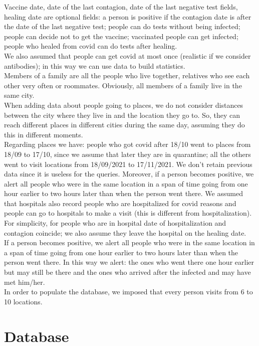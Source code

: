 \documentclass[12pt, a4paper]{article}
\begin{document}
Vaccine date, date of the last contagion, date of the last negative test fields, 
healing date are optional fields: a person is positive if the contagion date is 
after the date of the last negative test; people can do tests without being 
infected; people can decide not to get the vaccine; vaccinated people can get 
infected; people who healed from covid can do tests after healing. \\
We also assumed that people can get covid at most once (realistic if we consider 
antibodies); in this way we can use data to build statistics. \\
Members of a family are all the people who live together, relatives who see 
each other very often or roommates. Obviously, all members of a family live in 
the same city. \\
When adding data about people going to places, we do not consider distances 
between the city where they live in and the location they go to. So, they can 
reach different places in different cities during the same day, assuming they 
do this in different moments. \\
Regarding places we have: people who got covid after 18/10 went to places from 
18/09 to 17/10, since we assume that later they are in quarantine; all the 
others went to visit locations from 18/09/2021 to 17/11/2021. We don’t retain 
previous data since it is useless for the queries. Moreover, if a person becomes 
positive, we alert all people who were in the same location in a span of time 
going from one hour earlier to two hours later than when the person went 
there. We assumed that hospitals also record people who are hospitalized for covid reasons and people can go to hospitals to make a visit (this is different 
from hospitalization). For simplicity, for people who are in hospital date of hospitalization and 
contagion coincide; we also assume they leave the hospital on the healing 
date. \\ If a person becomes positive, we alert all people who were in the same location in a span of time going from one hour earlier to two hours later than when the person went there.
In this way we alert: the ones who went 
there one hour earlier but may still be there and the ones who arrived after the 
infected and may have met him/her. \\
In order to populate the database, we imposed that every person visits from 6 
to 10 locations. 

\clearpage

\section{Database}
\end{document}
